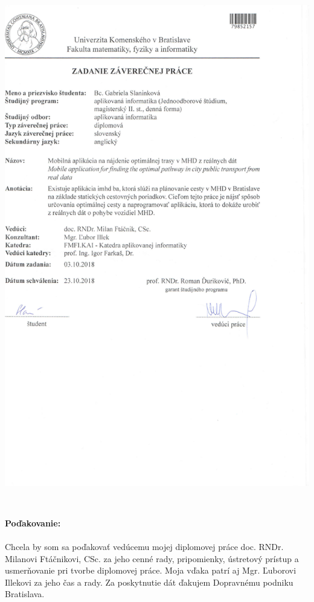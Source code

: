 \documentclass[12pt, oneside]{book}
\begin{document}
\newpage 
\thispagestyle{empty}
\hspace{-0.7cm}\includegraphics[width=1.1\textwidth]{images/zada}


\frontmatter

\setcounter{page}{3}
\newpage 
~

\vfill
{\bf Poďakovanie:}
\\ \\
Chcela by som sa poďakovať vedúcemu mojej diplomovej práce doc. RNDr. Milanovi Ftáčnikovi, CSc. za jeho cenné rady, pripomienky, ústretový prístup a usmerňovanie pri
tvorbe diplomovej práce. Moja vďaka patrí aj Mgr. Ľuborovi Illekovi za jeho čas a rady. Za poskytnutie dát ďakujem Dopravnému podniku Bratislava.
\end{document}
